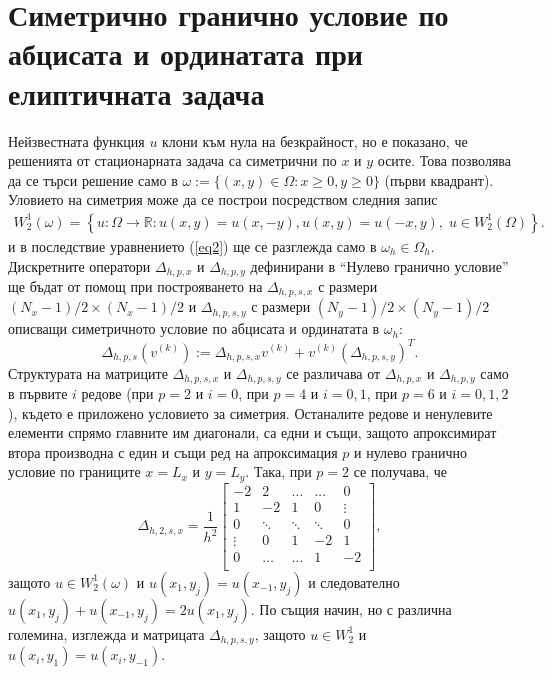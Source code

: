 \documentclass{article}
\newcommand{\be}{\begin{equation}}
\newcommand{\ee}{\end{equation}}
\newcommand{\rf}[1]{(\ref{#1})}
\newcommand{\RR}{\mathbb{R}}
\begin{document}
\section{Симетрично гранично условие по абцисата и ординатата при елиптичната задача}
Нейзвестната функция $u$ клони към нула на безкрайност, но е показано, че решенията от стационарната задача са симетрични по $x$ и $y$ осите. Това позволява да се търси решение само в $\omega := \{ (x,y) \in \Omega : x \geq 0, y \geq 0 \}$ (първи квадрант). Уловието на симетрия може да се построи посредством следния запис
\begin{align}\label{funSpaceSym}
W^1_2(\omega) =\left\{ u : \Omega \rightarrow \RR  : u(x,y) = u(x,-y), u(x,y) = u(-x,y), \; u \in W^1_2(\Omega) \right\}.
\end{align}
и в последствие уравнението \rf{eq2} ще се разглежда само в $\omega_h \in \Omega_h$. Дискретните оператори $\Delta_{h,p,x}$ и $\Delta_{h,p,y}$ дефинирани в ``Нулево гранично условие''  ще бъдат от помощ при построяването на $\Delta_{h,p,s,x}$ с размери $(N_x-1)/2 \times (N_x-1)/2$ и $\Delta_{h,p,s,y}$ с размери $(N_y-1)/2\times(N_y-1)/2$ описващи симетричното условие по абцисата и ординатата в $\omega_h$:
\be\label{PsnDiscretSym}
\Delta_{h,p,s}(v^{(k)}) := \Delta_{h,p,s,x}  v^{(k)} + v^{(k)} (\Delta_{h,p,s,y})^T.
\ee
Структурата на матриците $\Delta_{h,p,s,x}$ и $\Delta_{h,p,s,y}$ се различава от $\Delta_{h,p,x}$ и $\Delta_{h,p,y}$ само в първите $i$ редове (при $p=2$ и $i=0$, при $p=4$ и $i=0,1$, при $p=6$ и $i=0,1,2$), където е приложено условието за симетрия. Останалите редове и ненулевите елементи спрямо главните им диагонали, са едни и същи, защото апроксимират втора производна с един и същи ред на апроксимация $p$ и нулево гранично условие по границите $x=L_x$ и $y=L_y$. Така, при $p=2$ се получава, че 
\[
\Delta_{h,2,s,x} = \frac{1}{h^2}
\begin{bmatrix}
    -2	       & 2        &     \dots   &   \dots        & 0   \\
    1               & -2            &   1           &   0               & \vdots    \\
        0           & \ddots        &    \ddots    &   \ddots       &  0 \\ 
    \vdots       &     0            &  1     	& -2    	   & 1 \\
    0               & \dots          &  \dots         & 1  	   & -2 \\
\end{bmatrix}
,
\]
защото $u \in W^1_2(\omega)$ и $u(x_1, y_j) = u(x_{-1}, y_j)$ и следователно $u(x_1, y_j) + u(x_{-1}, y_j) = 2 u(x_1, y_j)$. По същия начин, но с различна големина, изглежда и матрицата $\Delta_{h,p,s,y}$, защото $u \in W^1_2$ и $u(x_i, y_1) = u(x_i, y_{-1})$.  
\end{document}
